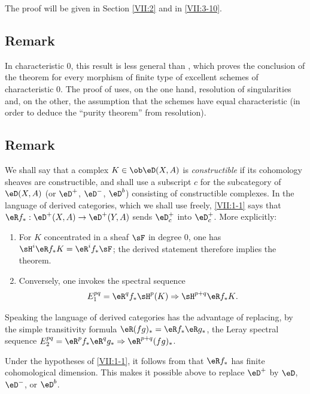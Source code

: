 \documentclass[oneside]{book}
\begin{document}
The proof will be given in Section \ref{VII:2} and in \ref{VII:3-10}.






\subsection{Remark}\label{VII:1-2}

In characteristic $0$, this result is less general than
\cite[XIX paragraphe 5]{sga4}, which proves the conclusion of the theorem for
every morphism of finite type of excellent schemes of characteristic $0$.
The proof of \cite[XIX]{sga4} uses, on the one hand, resolution of
singularities and, on the other, the assumption that the schemes have equal
characteristic (in order to deduce the ``purity theorem'' from resolution).






\subsection{Remark}\label{VII:1-3}

We shall say that a complex $K\in\ob\eD(X,A)$ is \emph{constructible} if its
cohomology sheaves are constructible, and shall use a subscript $c$ for the
subcategory of $\eD(X,A)$ (or $\eD^+$, $\eD^-$, $\eD^b$) consisting of
constructible complexes. In the language of derived categories, which we
shall use freely, \ref{VII:1-1} says that
$\eR f_\ast:\eD^+(X,A) \to \eD^+(Y,A)$ sends $\eD_c^+$ into $\eD_c^+$.
More explicitly:
\begin{enumerate}[\indent a)]
  \item For $K$ concentrated in a sheaf $\sF$ in degree $0$, one has
    $\sH^i\eR f_\ast K = \eR^i f_\ast \sF$; the derived statement therefore
    implies the theorem.
  \item Conversely, one invokes the spectral sequence
    \[
      E_1^{p q} = \eR^q f_\ast \sH^p(K) \Rightarrow \sH^{p+q} \eR f_\ast K \text{.}
    \]
\end{enumerate}

Speaking the language of derived categories has the advantage of replacing,
by the simple transitivity formula $\eR(f g)_\ast = \eR f_\ast \eR g_\ast$,
the Leray spectral sequence
$E_2^{p q} = \eR^p f_\ast \eR^q g_\ast \Rightarrow \eR^{p+q} (f g)_\ast$.

Under the hypotheses of \ref{VII:1-1}, it follows from \cite{sga4} that
$\eR f_\ast$ has finite cohomological dimension. This makes it possible above
to replace $\eD^+$ by $\eD$, $\eD^-$, or $\eD^b$.
\end{document}
